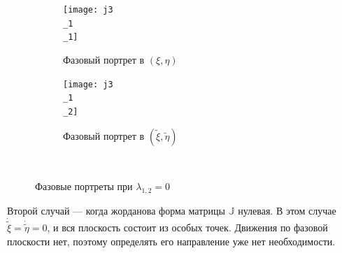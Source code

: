 \documentclass[12pt, a4paper]{article}
\begin{document}
\begin{enumerate}
\begin{enumerate}
	\begin{figure}[H]
		\centering
		\begin{subfigure}[H]{0.4\textwidth}
			\texttt{[image: j3\\\_1\\\_1]}
			\caption{Фазовый портрет в $(\xi,\eta)$}
			\label{oldfazov2}
		\end{subfigure}
		\qquad\qquad
		\begin{subfigure}[H]{0.4\textwidth}
			\texttt{[image: j3\\\_1\\\_2]}
			\caption{Фазовый портрет в $(\tilde\xi,\tilde\eta)$}
			\label{newfazov2}
		\end{subfigure}	
		\\[0.2cm]
		\caption{Фазовые портреты при $\lambda_{1,2}=0$}
	\end{figure}
	Второй случай --- когда жорданова форма матрицы $\mathbb{J}$ нулевая. В этом случае $\dot{\tilde\xi}=\dot{\tilde\eta}=0$,  и вся плоскость состоит из особых точек. Движения по фазовой плоскости нет, поэтому определять его направление уже нет необходимости.
\end{enumerate}	
	\end{enumerate}
\end{document}
